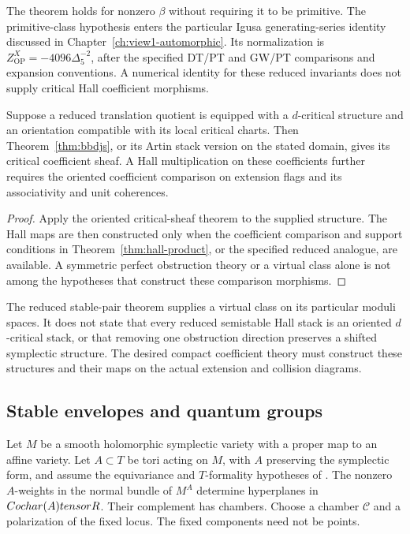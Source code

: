 The theorem holds for nonzero $\beta$ without requiring it to be
primitive. The primitive-class hypothesis enters the particular
Igusa generating-series identity discussed in
Chapter~\ref{ch:view1-automorphic}. Its normalization is
$Z^X_{\mathrm{OP}}=-4096\Delta_5^{-2}$, after the specified DT/PT
and GW/PT comparisons and expansion conventions. A numerical
identity for these reduced invariants does not supply critical Hall
coefficient morphisms.

\begin{proposition}
\label{prop:bbdjs-reduced-K3xE}
Suppose a reduced translation quotient is equipped with a
$d$-critical structure and an orientation compatible with its
local critical charts. Then Theorem~\ref{thm:bbdjs}, or its Artin
stack version on the stated domain, gives its critical coefficient
sheaf. A Hall multiplication on these coefficients further requires
the oriented coefficient comparison on extension flags and its
associativity and unit coherences.
\end{proposition}

\begin{proof}
Apply the oriented critical-sheaf theorem to the supplied structure.
The Hall maps are then constructed only when the coefficient
comparison and support conditions in
Theorem~\ref{thm:hall-product}, or the specified reduced analogue,
are available. A symmetric perfect obstruction theory or a virtual
class alone is not among the hypotheses that construct these
comparison morphisms.
\end{proof}

The reduced stable-pair theorem supplies a virtual class on its
particular moduli spaces. It does not state that every reduced
semistable Hall stack is an oriented $d$-critical stack, or that
removing one obstruction direction preserves a shifted symplectic
structure. The desired compact coefficient theory must construct
these structures and their maps on the actual extension and collision
diagrams.

\subsection{Stable envelopes and quantum groups}
\label{app:stable-envelope}

Let $M$ be a smooth holomorphic symplectic variety with a proper map
to an affine variety. Let $A\subset T$ be tori acting on $M$, with
$A$ preserving the symplectic form, and assume the equivariance and
$T$-formality hypotheses of \cite[\S3.1]{MaulikOkounkov}.
The nonzero $A$-weights in the normal bundle of $M^A$ determine
hyperplanes in $Cochar(A)tensorR$. Their
complement has chambers. Choose a chamber $\mathcal C$ and a
polarization of the fixed locus. The fixed components need not be
points.

